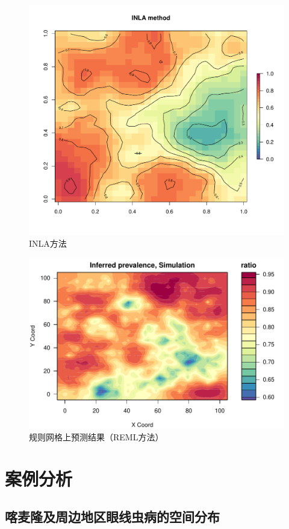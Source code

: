 \documentclass[hyperref, a4paper, UTF8, zihao = -4, linespread = 1.25, scheme = chinese]{ctexbook}
\begin{document}
\begin{figure}

{\centering \includegraphics[width=0.7\linewidth]{figures/INLA-simulation} 

}

\caption{INLA方法}\label{fig:inla-simulation}
\end{figure}

\newpage

\begin{figure}

{\centering \includegraphics[width=0.7\linewidth]{figures/spaMM-simulation} 

}

\caption{规则网格上预测结果（REML方法）}\label{fig:spamm-sim}
\end{figure}

\hypertarget{applications}{%
\chapter{案例分析}\label{applications}}

\section{喀麦隆及周边地区眼线虫病的空间分布}
\end{document}
